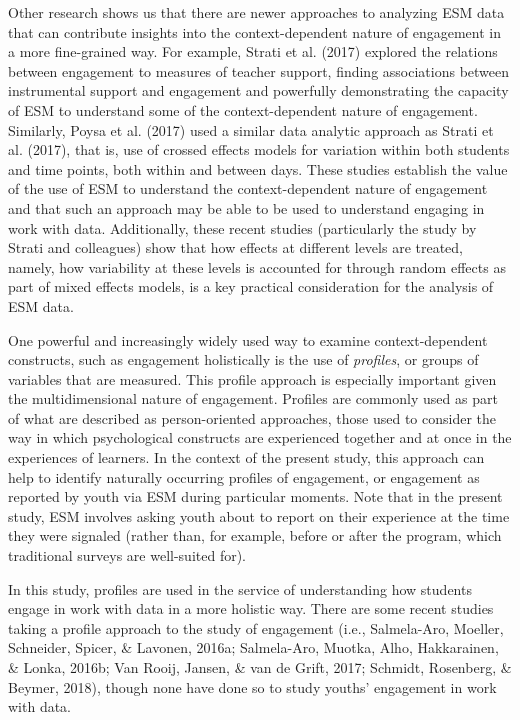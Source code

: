 \documentclass[]{msu-thesis}
\theoremstyle{definition}
\theoremstyle{definition}
\theoremstyle{definition}
\theoremstyle{remark}
\begin{document}
Other research shows us that there are newer approaches to analyzing ESM
data that can contribute insights into the context-dependent nature of
engagement in a more fine-grained way. For example, Strati et al. (2017)
explored the relations between engagement to measures of teacher
support, finding associations between instrumental support and
engagement and powerfully demonstrating the capacity of ESM to
understand some of the context-dependent nature of engagement.
Similarly, Poysa et al. (2017) used a similar data analytic approach as
Strati et al. (2017), that is, use of crossed effects models for
variation within both students and time points, both within and between
days. These studies establish the value of the use of ESM to understand
the context-dependent nature of engagement and that such an approach may
be able to be used to understand engaging in work with data.
Additionally, these recent studies (particularly the study by Strati and
colleagues) show that how effects at different levels are treated,
namely, how variability at these levels is accounted for through random
effects as part of mixed effects models, is a key practical
consideration for the analysis of ESM data.

One powerful and increasingly widely used way to examine
context-dependent constructs, such as engagement holistically is the use
of \emph{profiles}, or groups of variables that are measured. This
profile approach is especially important given the multidimensional
nature of engagement. Profiles are commonly used as part of what are
described as person-oriented approaches, those used to consider the way
in which psychological constructs are experienced together and at once
in the experiences of learners. In the context of the present study,
this approach can help to identify naturally occurring profiles of
engagement, or engagement as reported by youth via ESM during particular
moments. Note that in the present study, ESM involves asking youth about
to report on their experience at the time they were signaled (rather
than, for example, before or after the program, which traditional
surveys are well-suited for).

In this study, profiles are used in the service of understanding how
students engage in work with data in a more holistic way. There are some
recent studies taking a profile approach to the study of engagement
(i.e., Salmela-Aro, Moeller, Schneider, Spicer, \& Lavonen, 2016a;
Salmela-Aro, Muotka, Alho, Hakkarainen, \& Lonka, 2016b; Van Rooij,
Jansen, \& van de Grift, 2017; Schmidt, Rosenberg, \& Beymer, 2018),
though none have done so to study youths' engagement in work with data.
\end{document}
